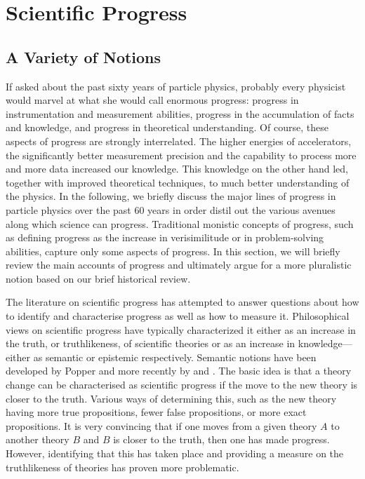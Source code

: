 
\section{Scientific Progress} 	\label{accounts}

\subsection{A Variety of Notions}
If asked about the past sixty years of particle physics, probably every physicist would marvel at what she would call enormous progress: progress in instrumentation and measurement abilities, progress in the accumulation of facts and knowledge, and progress in theoretical understanding. 
Of course, these aspects of progress are strongly interrelated. 
The higher energies of accelerators, the significantly better measurement
precision and the capability to process more and more data increased our knowledge.
This knowledge on the other hand led, together with improved theoretical techniques, to much better understanding of the physics.
In the following, we briefly discuss the major lines of progress in particle physics over the past 60 years in order distil out the various avenues along which science can progress.
Traditional monistic concepts of progress, such as defining progress as the increase in verisimilitude or in problem-solving abilities, capture only some aspects of progress.  
In this section, we will briefly review the main accounts of progress and ultimately argue for a more pluralistic notion based on our brief historical review. 

The literature on scientific progress has attempted to answer questions about how to identify and characterise progress as well as how to measure it. 
Philosophical views on scientific progress have typically characterized it either as an increase in the truth, or truthlikeness, of scientific theories or as an increase in knowledge---either as semantic or epistemic respectively. 
Semantic notions have been developed by Popper and more recently by \citet{Niiniluoto1980-NIISP,Niiniluoto1998-NIIVTT,Niiniluoto2014-NIISPA-2} and \citet{Rowbottom2015-ROWSPW}. 
The basic idea is that a theory change can be characterised as scientific progress if the move to the new theory is closer to the truth. 
Various ways of determining this, such as the new theory having more true propositions, fewer false propositions, or more exact propositions. 
It is very convincing that if one moves from a given theory $A$ to another theory $B$ and $B$ is closer to the truth, then one has made progress. 
However, identifying that this has taken place and providing a measure on the truthlikeness of theories has proven more problematic.

